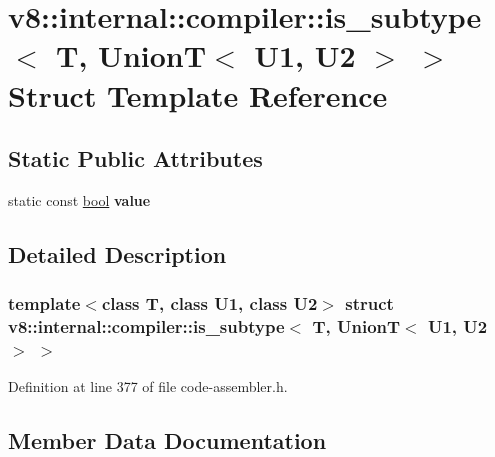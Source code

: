 \hypertarget{structv8_1_1internal_1_1compiler_1_1is__subtype_3_01T_00_01UnionT_3_01U1_00_01U2_01_4_01_4}{}\section{v8\+:\+:internal\+:\+:compiler\+:\+:is\+\_\+subtype$<$ T, UnionT$<$ U1, U2 $>$ $>$ Struct Template Reference}
\label{structv8_1_1internal_1_1compiler_1_1is__subtype_3_01T_00_01UnionT_3_01U1_00_01U2_01_4_01_4}
\subsection*{Static Public Attributes}
\begin{DoxyCompactItemize}
\item 
static const \mbox{\hyperlink{classbool}{bool}} {\bfseries value}
\end{DoxyCompactItemize}


\subsection{Detailed Description}
\subsubsection*{template$<$class T, class U1, class U2$>$\newline
struct v8\+::internal\+::compiler\+::is\+\_\+subtype$<$ T, Union\+T$<$ U1, U2 $>$ $>$}



Definition at line 377 of file code-\/assembler.\+h.



\subsection{Member Data Documentation}
\mbox{\label{structv8_1_1internal_1_1compiler_1_1is__subtype_3_01T_00_01UnionT_3_01U1_00_01U2_01_4_01_4_aa941601ec71ddc516c8fa0ad922cf43c}} 
